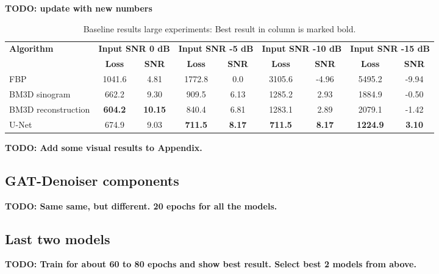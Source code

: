 \textbf{TODO: update with new numbers}

\begin{table}[H]
  \centering
  \begin{threeparttable}
    \begin{tabular}{l|cc|cc|cc|cc}
    \toprule
    \textbf{Algorithm} & \multicolumn{2}{l|}{\footnotesize \textbf{Input SNR 0 dB}} & \multicolumn{2}{l|}{\footnotesize \textbf{Input SNR -5 dB}} & \multicolumn{2}{l|}{\footnotesize \textbf{Input SNR -10 dB}} & \multicolumn{2}{l}{\footnotesize \textbf{Input SNR -15 dB}} \\
                       & \textbf{Loss} & \textbf{SNR} & \textbf{Loss} & \textbf{SNR} & \textbf{Loss} & \textbf{SNR} & \textbf{Loss} & \textbf{SNR} \\ 
    \midrule
    FBP                 &  1041.6          &  4.81            & 1772.8         & 0.0           & 3105.6          & -4.96          & 5495.2       & -9.94       \\ \hline
    BM3D sinogram       &  662.2           &  9.30            & 909.5          & 6.13          & 1285.2          & 2.93           & 1884.9       & -0.50       \\ \hline
    BM3D reconstruction &  \textbf{604.2}  &  \textbf{10.15}  & 840.4          & 6.81          & 1283.1          & 2.89           & 2079.1       & -1.42       \\ \hline
    U-Net               &  674.9           &  9.03            & \textbf{711.5} & \textbf{8.17} & \textbf{711.5}  & \textbf{8.17}  & \textbf{1224.9}       & \textbf{3.10}        \\ 
    \midrule
    \end{tabular}

  \end{threeparttable}

  \caption{Baseline results large experiments: Best result in column is marked bold. }
  \label{tab:baseline-large}
\end{table}

\textbf{TODO: Add some visual results to Appendix.}

\subsection{GAT-Denoiser components}

\textbf{TODO: Same same, but different. 20 epochs for all the models.}

\subsection{Last two models}

\textbf{TODO: Train for about 60 to 80 epochs and show best result.
Select best 2 models from above.}
